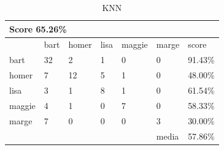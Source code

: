 \documentclass[paper=a4, fontsize=11pt]{scrartcl} %
\numberwithin{equation}{section} %
\numberwithin{figure}{section} %
\numberwithin{table}{section} %
\begin{document}
\begin{table}[!htb]
\centering
\caption{KNN}
\label{tbl:knn}
\begin{tabular}{|l|l|l|l|l|l|l|}
\hline
\multicolumn{7}{|l|}{\textbf{Score 65.26\%}}                   \\ \hline
         & bart   & homer   & lisa   & maggie   & marge  & score    \\ \hline
bart     & 32     & 2       & 1      & 0        & 0      & 91.43\%  \\ \hline
homer    & 7      & 12      & 5      & 1        & 0      & 48.00\%  \\ \hline
lisa     & 3      & 1       & 8      & 1        & 0      & 61.54\%  \\ \hline
maggie   & 4      & 1       & 0      & 7        & 0      & 58.33\%  \\ \hline
marge    & 7      & 0       & 0      & 0        & 3      & 30.00\%  \\ \hline
         &        &         &        &          & media  & 57.86\%  \\ \hline
\end{tabular}
\end{table}
\end{document}
